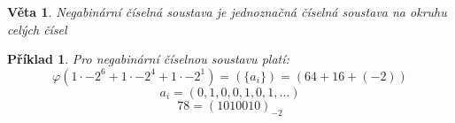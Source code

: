 \documentclass[12pt]{book}
\newtheorem{definice}{Definice}
\newtheorem{veta}{Věta}
\newtheorem*{pr}{Příklad}
\begin{document}
\begin{veta}
	Negabinární číselná soustava je jednoznačná číselná soustava na okruhu celých čísel
\end{veta}

\begin{pr}
	Pro negabinární číselnou soustavu platí:
	$$\varphi(1\cdot-2^6+1\cdot-2^4+1\cdot-2^1)=(\{a_i\})=(64+16+(-2))$$
	$${a_i}=(0,1,0,0,1,0,1,\dots) $$
	$$78 =(1010010)_{-2}$$
\end{pr}












\end{document}
